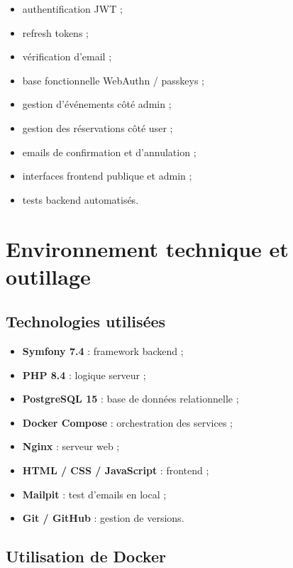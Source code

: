 \documentclass[12pt,a4paper]{report}
\begin{document}
\begin{itemize}[leftmargin=1.2cm]
    \item authentification JWT ;
    \item refresh tokens ;
    \item vérification d'email ;
    \item base fonctionnelle WebAuthn / passkeys ;
    \item gestion d'événements côté admin ;
    \item gestion des réservations côté user ;
    \item emails de confirmation et d'annulation ;
    \item interfaces frontend publique et admin ;
    \item tests backend automatisés.
\end{itemize}

\chapter{Environnement technique et outillage}

\section{Technologies utilisées}

\begin{itemize}[leftmargin=1.2cm]
    \item \textbf{Symfony 7.4} : framework backend ;
    \item \textbf{PHP 8.4} : logique serveur ;
    \item \textbf{PostgreSQL 15} : base de données relationnelle ;
    \item \textbf{Docker Compose} : orchestration des services ;
    \item \textbf{Nginx} : serveur web ;
    \item \textbf{HTML / CSS / JavaScript} : frontend ;
    \item \textbf{Mailpit} : test d'emails en local ;
    \item \textbf{Git / GitHub} : gestion de versions.
\end{itemize}

\section{Utilisation de Docker}
\end{document}
